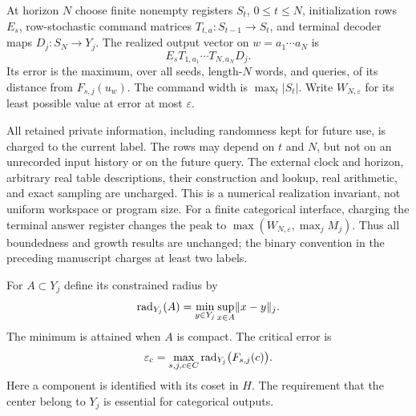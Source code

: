 \begin{definition}\label{def:machine54}
At horizon $N$ choose finite nonempty registers $S_t$, $0\le t\le N$, initialization rows $E_s$, row-stochastic command matrices $T_{t,a}:S_{t-1}\to S_t$, and terminal decoder maps $D_j:S_N\to Y_j$. The realized output vector on $w=a_1\cdots a_N$ is
\[
 E_sT_{1,a_1}\cdots T_{N,a_N}D_j.
\]
Its error is the maximum, over all seeds, length-$N$ words, and queries, of its distance from $F_{s,j}(u_w)$. The command width is $\max_t|S_t|$. Write $W_{N,\varepsilon}$ for its least possible value at error at most $\varepsilon$.
\end{definition}
All retained private information, including randomness kept for future use, is charged to the current label. The rows may depend on $t$ and $N$, but not on an unrecorded input history or on the future query. The external clock and horizon, arbitrary real table descriptions, their construction and lookup, real arithmetic, and exact sampling are uncharged. This is a numerical realization invariant, not uniform workspace or program size. For a finite categorical interface, charging the terminal answer register changes the peak to $\max(W_{N,\varepsilon},\max_j M_j)$. Thus all boundedness and growth results are unchanged; the binary convention in the preceding manuscript charges at least two labels.

For $A\subset Y_j$ define its constrained radius by
\[
 \operatorname{rad}_{Y_j}(A)=\min_{y\in Y_j}\sup_{x\in A}\lVert x-y\rVert_j.
\]
The minimum is attained when $A$ is compact. The critical error is
\begin{equation}\label{eq:radius54}
 \varepsilon_{\mathrm c}=\max_{s,j,c\in C}\operatorname{rad}_{Y_j}\bigl(F_{s,j}(c)\bigr).
\end{equation}
Here a component is identified with its coset in $H$. The requirement that the center belong to $Y_j$ is essential for categorical outputs.

